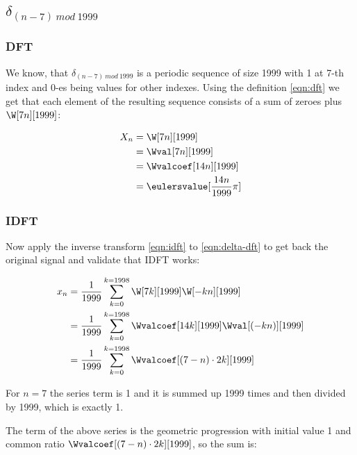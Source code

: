 \documentclass[a4paper]{article}
\theoremstyle{break}
\theoremstyle{break}
\begin{document}
\subsection{$\delta_{(n - 7)\ mod\ 1999}$}

\subsubsection{DFT}

We know, that $\delta_{(n - 7)\ mod\ 1999}$ is a periodic sequence of size 1999 with 1 at 7-th index and 0-es being values for other indexes. Using the definition \eqref{eqn:dft} we get that each element of the resulting sequence consists of a sum of zeroes plus $\W[7n][1999]$:

\begin{equation} \label{eqn:delta-dft}
  \begin{split}
    X_n &= \W[7n][1999] \\
        &= \Wval[7n][1999] \\
        &= \Wvalcoef[14n][1999] \\
        &= \eulersvalue[\frac{14n}{1999}\pi]
  \end{split}
\end{equation}

\subsubsection{IDFT}

Now apply the inverse transform \eqref{eqn:idft} to \eqref{eqn:delta-dft} to get back the original signal and validate that IDFT works:

\begin{equation*}
  \begin{split}
    x_n &= \frac{1}{1999} \sum_{k = 0}^{k = 1998} \W[7k][1999] \W[-kn][1999] \\
        &= \frac{1}{1999} \sum_{k = 0}^{k = 1998} \Wvalcoef[14k][1999] \Wval[(-kn)][1999] \\
        &= \frac{1}{1999} \sum_{k = 0}^{k = 1998} \Wvalcoef[(7 - n) \cdot 2k][1999]
  \end{split}
\end{equation*}


For $n = 7$ the series term is 1 and it is summed up 1999 times and then divided by 1999, which is exactly 1.

The term of the above series is the geometric progression with initial value 1 and common ratio $\Wvalcoef[(7 - n) \cdot 2k][1999]$, so the sum is:
\end{document}
